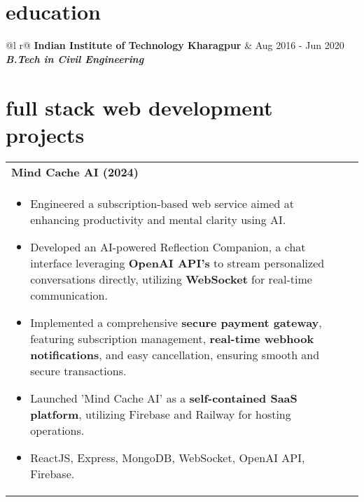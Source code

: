 \documentclass[a4paper,8pt]{article}
\begin{document}
\vspace{4 pt}

\section{education}
\begin{tabularx}{\linewidth}{ @{}l r@{} }
\color[HTML]{1C033C} \textbf{Indian Institute of Technology Kharagpur} & \hfill \color[HTML]{371e77} Aug 2016 - Jun 2020 \\[2pt]
\color[HTML]{371e77}\textbf{\textit{B.Tech in Civil Engineering}} \color[HTML]{4B28A4} \\[5pt]
\end{tabularx}

\vspace{-8pt}

\section{full stack web development projects}
\begin{tabularx}{\linewidth}{ @{}l r@{} }
\textbf{{Mind Cache AI (2024)}} \hfill \color[HTML]{371e77} \\[1pt]
\begin{minipage}[t]{\linewidth}
    \begin{itemize}[nosep,after=\strut, leftmargin=2em, itemsep=2pt]
        \item Engineered a subscription-based web service aimed at enhancing productivity and mental clarity using AI.
        \item Developed an AI-powered Reflection Companion, a chat interface leveraging \textbf{OpenAI API's} to stream personalized conversations directly, utilizing \textbf{WebSocket} for real-time communication.
        \item Implemented a comprehensive \textbf{secure payment gateway}, featuring subscription management, \textbf{real-time webhook notifications}, and easy cancellation, ensuring smooth and secure transactions.
        \item Launched 'Mind Cache AI' as a \textbf{self-contained SaaS platform}, utilizing Firebase and Railway for hosting operations.
        \item ReactJS, Express, MongoDB, WebSocket, OpenAI API, Firebase.
    \end{itemize}
\end{minipage}
\end{tabularx}
\end{document}
